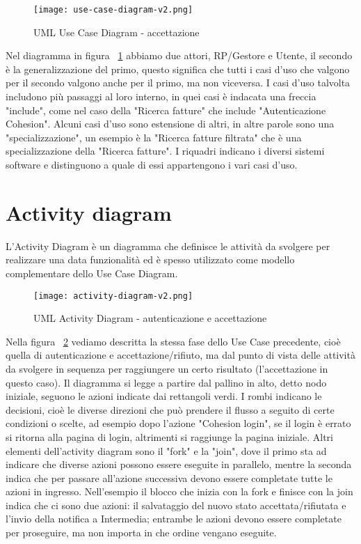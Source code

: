 \begin{figure}[H]
    \centering
    \texttt{[image: use-case-diagram-v2.png]}
    \caption{UML Use Case Diagram - accettazione}
    \label{fig:UseCase1}
\end{figure}

Nel diagramma in figura  ~\ref{fig:UseCase1} abbiamo due attori, RP/Gestore e Utente, il secondo è la generalizzazione del primo, questo significa che tutti i casi d'uso che valgono per il secondo valgono anche per il primo, ma non viceversa.
I casi d'uso talvolta includono più passaggi al loro interno, in quei casi è indacata una freccia "include", come nel caso della "Ricerca fatture" che include "Autenticazione Cohesion".
Alcuni casi d'uso sono estensione di altri, in altre parole sono una "specializzazione", un esempio è la "Ricerca fatture filtrata" che è una specializzazione della "Ricerca fatture".
I riquadri indicano i diversi sistemi software e distinguono a quale di essi appartengono i vari casi d'uso.


\newpage

\section{Activity diagram}

L'Activity Diagram è un diagramma che definisce le attività da svolgere per realizzare una data funzionalità ed è spesso utilizzato come modello complementare dello Use Case Diagram.

\begin{figure}[H]
    \centering
    \texttt{[image: activity-diagram-v2.png]}
    \caption{UML Activity Diagram - autenticazione e accettazione}
    \label{fig:ActivityDiagram1}
\end{figure}

Nella figura ~\ref{fig:ActivityDiagram1} vediamo descritta la stessa fase dello Use Case precedente, cioè quella di autenticazione e accettazione/rifiuto, ma dal punto di vista delle attività da svolgere in sequenza per raggiungere un certo risultato (l'accettazione in questo caso).
Il diagramma si legge a partire dal pallino in alto, detto nodo iniziale, seguono le azioni indicate dai rettangoli verdi.
I rombi indicano le decisioni, cioè le diverse direzioni che può prendere il flusso a seguito di certe condizioni o scelte, ad esempio dopo l'azione "Cohesion login", se il login è errato si ritorna alla pagina di login, altrimenti si raggiunge la pagina iniziale.
Altri elementi dell'activity diagram sono il "fork" e la "join", dove il primo sta ad indicare che diverse azioni possono essere eseguite in parallelo, mentre la seconda indica che per passare all'azione successiva devono essere completate tutte le azioni in ingresso.
Nell'esempio il blocco che inizia con la fork e finisce con la join indica che ci sono due azioni: il salvataggio del nuovo stato accettata/rifiutata e l'invio della notifica a Intermedia; entrambe le azioni devono essere completate per proseguire, ma non importa in che ordine vengano eseguite.

